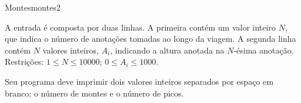 \documentclass[12pt,a4paper,oneside]{article}
\begin{document}
\begin{problem}{Montes}{montes}{2}
\InputFile

A entrada é composta por duas linhas. A primeira contém um valor inteiro $N$, que indica o número de anotações tomadas ao longo da viagem. A segunda linha contém $N$ valores inteiros, $A_i$, indicando a altura anotada na $N$-ésima anotação. Restrições: $1 \leq N \leq 10000$; $0 \leq A_i \leq 1000$.

\OutputFile

Seu programa deve imprimir dois valores inteiros separados por espaço em branco: o número de montes e o número de picos.


\Example

\begin{examplewide}
%
\end{examplewide}

\begin{examplewide}
%
\end{examplewide}

\begin{examplewide}
%
\end{examplewide}

\begin{examplewide}
%
\end{examplewide}

\begin{examplewide}
%
\end{examplewide}

\begin{examplewide}
%
\end{examplewide}


\begin{examplewide}
%
\end{examplewide}


\end{problem}
\end{document}
